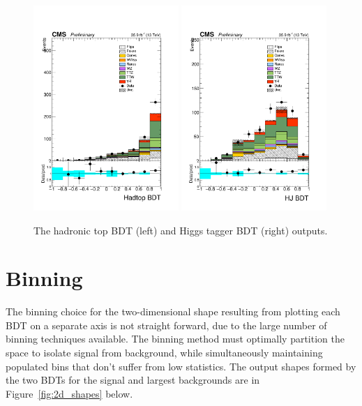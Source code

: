 \begin{figure}[htp]
\centering
\includegraphics[width=0.49\textwidth]{ch8_figs/hadtop_bdt_ttH_stackPlot_SR.pdf}
\includegraphics[width=0.49\textwidth]{ch8_figs/hj_bdt_ttH_stackPlot_SR.pdf}
\caption[Data to MC comparison of reconstruction BDT outputs]{The hadronic top BDT (left) and Higgs tagger BDT (right) outputs.}
\label{fig:reco_bdt_stacks}
\end{figure}



\section{Binning}
The binning choice for the two-dimensional shape resulting from plotting each BDT on a separate axis is not straight forward, due to the large number of binning techniques
available. The binning method must optimally partition the space to isolate
signal from background, while simultaneously maintaining populated bins that don't suffer from low statistics. The output shapes formed by the two BDTs for the signal and largest backgrounds
are in Figure~\ref{fig:2d_shapes} below. 

